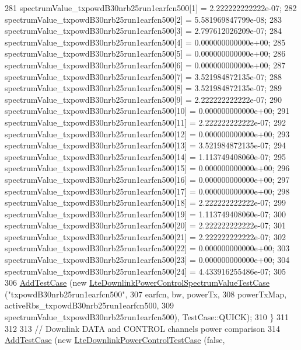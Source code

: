 \begin{DoxyCode}
281     spectrumValue\_txpowdB30nrb25run1earfcn500[1] = 2.222222222222e-07;
282     spectrumValue\_txpowdB30nrb25run1earfcn500[2] = 5.581969847799e-08;
283     spectrumValue\_txpowdB30nrb25run1earfcn500[3] = 2.797612026209e-07;
284     spectrumValue\_txpowdB30nrb25run1earfcn500[4] = 0.000000000000e+00;
285     spectrumValue\_txpowdB30nrb25run1earfcn500[5] = 0.000000000000e+00;
286     spectrumValue\_txpowdB30nrb25run1earfcn500[6] = 0.000000000000e+00;
287     spectrumValue\_txpowdB30nrb25run1earfcn500[7] = 3.521984872135e-07;
288     spectrumValue\_txpowdB30nrb25run1earfcn500[8] = 3.521984872135e-07;
289     spectrumValue\_txpowdB30nrb25run1earfcn500[9] = 2.222222222222e-07;
290     spectrumValue\_txpowdB30nrb25run1earfcn500[10] = 0.000000000000e+00;
291     spectrumValue\_txpowdB30nrb25run1earfcn500[11] = 2.222222222222e-07;
292     spectrumValue\_txpowdB30nrb25run1earfcn500[12] = 0.000000000000e+00;
293     spectrumValue\_txpowdB30nrb25run1earfcn500[13] = 3.521984872135e-07;
294     spectrumValue\_txpowdB30nrb25run1earfcn500[14] = 1.113749408060e-07;
295     spectrumValue\_txpowdB30nrb25run1earfcn500[15] = 0.000000000000e+00;
296     spectrumValue\_txpowdB30nrb25run1earfcn500[16] = 0.000000000000e+00;
297     spectrumValue\_txpowdB30nrb25run1earfcn500[17] = 0.000000000000e+00;
298     spectrumValue\_txpowdB30nrb25run1earfcn500[18] = 2.222222222222e-07;
299     spectrumValue\_txpowdB30nrb25run1earfcn500[19] = 1.113749408060e-07;
300     spectrumValue\_txpowdB30nrb25run1earfcn500[20] = 2.222222222222e-07;
301     spectrumValue\_txpowdB30nrb25run1earfcn500[21] = 2.222222222222e-07;
302     spectrumValue\_txpowdB30nrb25run1earfcn500[22] = 0.000000000000e+00;
303     spectrumValue\_txpowdB30nrb25run1earfcn500[23] = 0.000000000000e+00;
304     spectrumValue\_txpowdB30nrb25run1earfcn500[24] = 4.433916255486e-07;
305 
306     \hyperlink{classns3_1_1TestCase_a3718088e3eefd5d6454569d2e0ddd835}{AddTestCase} (\textcolor{keyword}{new} \hyperlink{classLteDownlinkPowerControlSpectrumValueTestCase}{LteDownlinkPowerControlSpectrumValueTestCase}
       (\textcolor{stringliteral}{"txpowdB30nrb25run1earfcn500"},
307                                                                    earfcn, bw, powerTx,
308                                                                    powerTxMap, 
      activeRbs\_txpowdB30nrb25run1earfcn500,
309                                                                    
      spectrumValue\_txpowdB30nrb25run1earfcn500), TestCase::QUICK);
310   \}
311 
312 
313   \textcolor{comment}{// Downlink DATA and CONTROL channels power comparison}
314   \hyperlink{classns3_1_1TestCase_a3718088e3eefd5d6454569d2e0ddd835}{AddTestCase} (\textcolor{keyword}{new} \hyperlink{classLteDownlinkPowerControlTestCase}{LteDownlinkPowerControlTestCase} (\textcolor{keyword}{false}, 

\end{DoxyCode}
